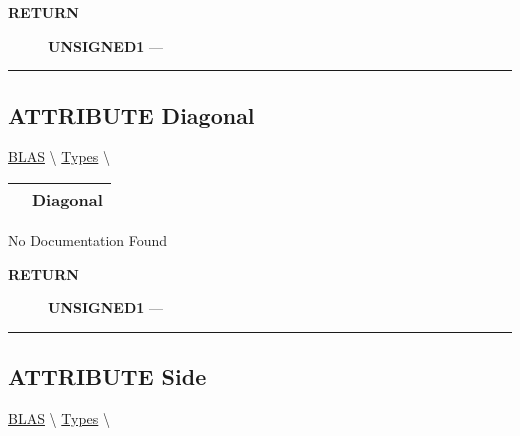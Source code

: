 \par
\begin{description}
\item [\colorbox{tagtype}{\color{white} \textbf{\textsf{RETURN}}}] \textbf{UNSIGNED1} --- 
\end{description}




\rule{\linewidth}{0.5pt}
\subsection*{\textsf{\colorbox{headtoc}{\color{white} ATTRIBUTE}
Diagonal}}

\hypertarget{ecldoc:ecldoc-Diagonal}{}
\hspace{0pt} \hyperlink{ecldoc:blas}{BLAS} \textbackslash 
\hspace{0pt} \hyperlink{ecldoc:BLAS.Types}{Types} \textbackslash 

{\renewcommand{\arraystretch}{1.5}
\begin{tabularx}{\textwidth}{|>{\raggedright\arraybackslash}l|X|}
\hline
\hspace{0pt}\mytexttt{\color{red} } & \textbf{Diagonal} \\
\hline
\end{tabularx}
}

\par





No Documentation Found








\par
\begin{description}
\item [\colorbox{tagtype}{\color{white} \textbf{\textsf{RETURN}}}] \textbf{UNSIGNED1} --- 
\end{description}




\rule{\linewidth}{0.5pt}
\subsection*{\textsf{\colorbox{headtoc}{\color{white} ATTRIBUTE}
Side}}

\hypertarget{ecldoc:ecldoc-Side}{}
\hspace{0pt} \hyperlink{ecldoc:blas}{BLAS} \textbackslash 
\hspace{0pt} \hyperlink{ecldoc:BLAS.Types}{Types} \textbackslash 

